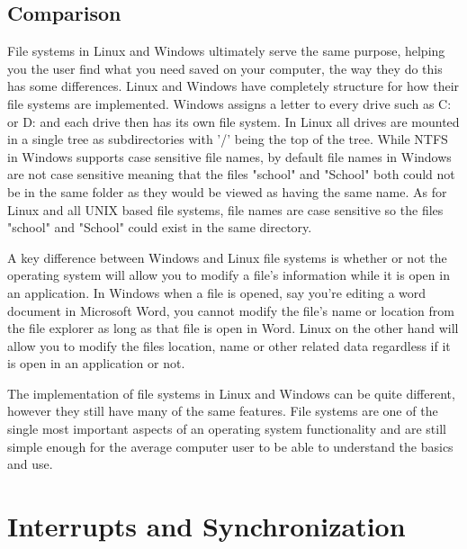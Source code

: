 \documentclass[10pt,serif,draftclsnofoot,onecolumn]{IEEEtran}
\begin{document}
	\subsection{Comparison}
	\par
	File systems in Linux and Windows ultimately serve the same purpose, helping you the user find what you need saved on your computer, the way they do this has some differences. Linux and Windows have completely structure for how their file systems are implemented. Windows assigns a letter to every drive such as C: or D: and each drive then has its own file system\cite{19}. In Linux all drives are mounted in a single tree as subdirectories with '/' being the top of the tree. While NTFS in Windows supports case sensitive file names, by default  file names in Windows are not case sensitive meaning that the files "school" and "School" both could not be in the same folder as they would be viewed as having the same name. As for Linux and all UNIX based file systems, file names are case sensitive so the files "school" and "School" could exist in the same directory.
	\newline
	\par
	A key difference between Windows and Linux file systems is whether or not the operating system will allow you to modify a file's information while it is open in an application. In Windows when a file is opened, say you're editing a word document in Microsoft Word, you cannot modify the file's name or location from the file explorer as long as that file is open in Word. Linux on the other hand will allow you to modify the files location, name or other related data regardless if it is open in an application or not.
	\newline
	\par
	The implementation of file systems in Linux and Windows can be quite different, however they still have many of the same features. File systems are one of the single most important aspects of an operating system functionality and are still simple enough for the average computer user to be able to understand the basics and use.
\section{Interrupts and Synchronization}
\end{document}
